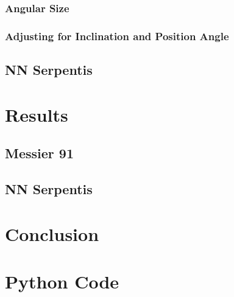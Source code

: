 \documentclass[%
reprint,
amsmath,amssymb,
aps,
]{revtex4-2}
\begin{document}
			\subsubsection{Angular Size}
			
			\subsubsection{Adjusting for Inclination and Position Angle}
		
		
		\subsection{NN Serpentis}
		
		
	\section{Results}
	
		\subsection{Messier 91}
		
		\subsection{NN Serpentis}

	\section{Conclusion}
		
		
		
	\appendix
		
	\section{Python Code}
		
		
		
\end{document}
